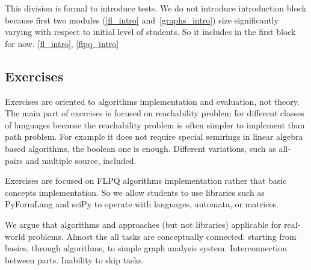 \documentclass[sigconf]{acmart}
\begin{document}
This division is formal to introduce tests.
We do not introduce introduction block because first two modules (\ref{fl_intro} and~\ref{graphs_intro}) size significantly varying with respect to initial level of students.
So it includes in the first block for now. \ref{fl_intro}, \ref{flpq_intro}


\subsection{Exercises}

Exercises are oriented to algorithms implementation and evaluation, not theory. 
The main part of exercises is focused on reachability problem for different classes of languages because the reachability problem is often simpler to implement than path problem.
For example it does not require special semirings in linear algebra based algorithms, the boolean one is enough.  
Different variations, such as all-pairs and multiple source, included.

Exercises are focused on FLPQ algorithms implementation rather that basic concepts implementation.
So we allow students to use libraries such as PyFormLang and sciPy to operate with languages, automata, or matrices.

We argue that algorithms and approaches (but not libraries) applicable for real-world problems. 
Almost the all tasks are conceptually connected: starting from basics, through algorithms, to simple graph analysis system.
Interconnection between parts. 
Inability to skip tasks. 
\end{document}
